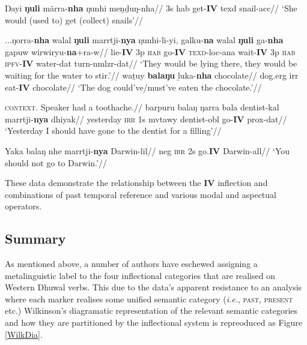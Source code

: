 \pex\a{}\begingl\gla Ŋayi \textbf{ŋuli} märra-\textbf{nha} ŋunhi meṉḏuŋ-nha//
\glb 3s \gls{hab} get-\textbf{IV} \gls{texd} snail-\gls{acc}//
\glft`She would (used to) get (collect) snails'//\endgl

\a\begingl\gla ...ŋorra-\textbf{nha} walal \textbf{ŋuli} marrtji-\textbf{nya} ŋunhi-li-yi, galku-\textbf{na} walal \textbf{ŋuli} ga-\textbf{nha} gapuw wirwiryu-\textbf{na}+ra-w//
\glb lie-\textbf{IV} 3p \textsc{hab} go-\textbf{IV} \textsc{texd}-\gls{loc}-\gls{ana} wait-\textbf{IV} 3p \textsc{hab} \textsc{ipfv}-\textbf{IV} water-\gls{dat} turn-\gls{nmlzr}-\gls{dat}//
\glft`They would be lying there, they would be waiting for the water to stir.'//\endgl
\a\begingl\gla waṯuy \textbf{balaŋu} ḻuka-\textbf{nha} chocolate//
\glb dog.\gls{erg} \gls{irr} eat-\textbf{IV} chocolate//
\glft`The dog could've/must've eaten the chocolate.'\trailingcitation{[DG~20190413]}//\endgl

\xe

\pex\a\begingl\glpreamble{}\textsc{context.} Speaker had a toothache.//
\gla barpuru balaŋ ŋarra bala dentist-kal marrtji-\textbf{nya} dhiyak//
\glb yesterday \textsc{irr} 1s \gls{mvtawy} dentist-\gls{obl} go-\textbf{IV} \gls{prox}-\gls{dat}//
\glft`Yesterday I should have gone to the dentist for a filling'//\endgl

\a\begingl\gla Yaka balaŋ nhe marrtji-\textbf{nya} Darwin-lil//
\glb \gls{neg} \textsc{irr} 2s go.\textbf{IV} Darwin-\gls{all}//
\glft`You should not go to Darwin.'//\endgl\xe


These data demonstrate the relationship between the \textbf{IV} inflection and combinations of past temporal reference and various modal and aspectual operators. 


\subsection{Summary}

As mentioned above, a number of authors have eschewed assigning a metalinguistic label to the four inflectional categories that are realised on Western Dhuwal verbs. This due to the data's apparent resistance to an analysis where each marker realises some unified semantic category (\textit{i.e.}, \textsc{past, present} etc.) Wilkinson's diagramatic representation of the relevant semantic categories and how they are partitioned by the inflectional system is repreoduced as Figure \ref{WilkDia}.




